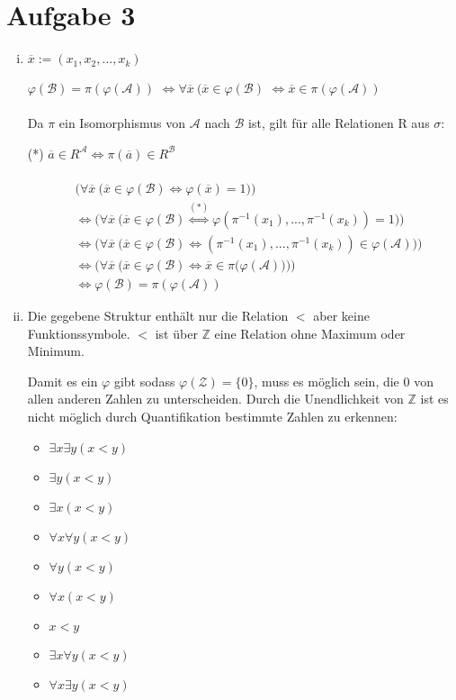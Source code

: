 \documentclass[a4paper,10pt]{article}
\begin{document}
\section*{Aufgabe 3}
\begin{enumerate}[(i)]
\item
$\overline{x} := (x_1,x_2,...,x_k)$

$\varphi(\mathcal{B}) = \pi(\varphi(\mathcal{A}))$
$\Leftrightarrow \forall \overline{x}~ (\overline{x} \in \varphi(\mathcal{B})$
$\Leftrightarrow \overline{x} \in \pi(\varphi(\mathcal{A}))$
\\
\\
Da $\pi$ ein Isomorphismus von $\mathcal{A}$ nach $\mathcal{B}$ ist, gilt für alle Relationen R aus $\sigma$: 

(*) $\overline{a} \in R^{\mathcal{A}} \Leftrightarrow \pi(\overline{a}) \in R^{\mathcal{B}}$
\\
\\
\begin{align*}
&\big(\forall \overline{x}~ \big( \overline{x} \in \varphi(\mathcal{B})  \Leftrightarrow \varphi(\overline{x}) =1\big)\big) \\
&\Leftrightarrow \big(\forall \overline{x}~ \big( \overline{x} \in \varphi(\mathcal{B})  \overset{(*)}{\Leftrightarrow} \varphi(\pi^{-1}(x_1),...,\pi^{-1}(x_k)) = 1\big)\big) \\
&\Leftrightarrow \big(\forall \overline{x}~ \big( \overline{x} \in \varphi(\mathcal{B})  \Leftrightarrow (\pi^{-1}(x_1),...,\pi^{-1}(x_k)) \in \varphi(\mathcal{A}))\big) \\ 
&\Leftrightarrow \big(\forall \overline{x}~ \big( \overline{x} \in \varphi(\mathcal{B})  \Leftrightarrow \overline{x} \in \pi(\varphi(\mathcal{A}) \big)\big)\big) \\
&\Leftrightarrow \varphi(\mathcal{B}) = \pi(\varphi(\mathcal{A}))
\end{align*}


\item
Die gegebene Struktur enthält nur die Relation $<$ aber keine Funktionssymbole. 
$<$ ist über $\mathbb{Z}$ eine Relation ohne Maximum oder Minimum. 

Damit es ein $\varphi$ gibt sodass $\varphi(\mathcal{Z}) = \lbrace 0 \rbrace$, muss es möglich sein, die $0$ von allen anderen Zahlen zu unterscheiden. Durch die Unendlichkeit von $\mathbb{Z}$ ist es nicht möglich durch Quantifikation bestimmte Zahlen zu erkennen:
\begin{itemize}
\item
$\exists x \exists y (x < y)$
\item
$\exists y (x < y)$
\item
$\exists x (x < y)$
\item
$\forall x \forall y (x < y)$
\item
$\forall y (x < y)$
\item
$\forall x (x < y)$
\item
$x < y$
\item
$\exists x \forall y (x < y)$
\item
$\forall x \exists y (x < y)$


\end{itemize}
\end{enumerate}
\end{document}
